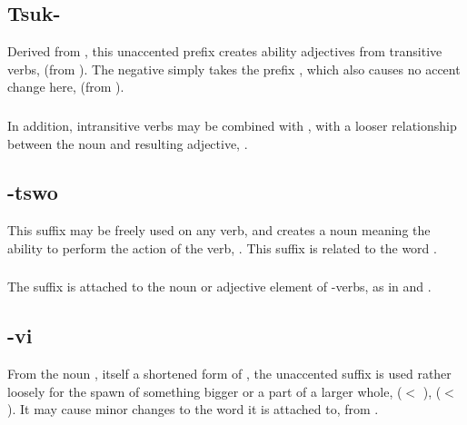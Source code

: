 \subsection{Tsuk-} Derived from , this unaccented prefix
creates ability adjectives from trans\-it\-ive verbs, 
 (from  ).  The negative simply takes the
prefix , which also causes no accent change here,
  (from  ).

\subsubsection{} In addition, intransitive verbs may
be combined with , with a looser relationship between the
noun and resulting adjective, 
  .

\subsection{-tswo} This suffix may be freely used on any verb, and
creates a noun meaning the ability to perform the action of the verb,
   .
This suffix is related to the word  .

\subsubsection{} The suffix  is attached to the noun or
adjective element of -verbs, as in   and  .

\subsection{-vi} From the noun , itself a shortened form of
 , the unaccented suffix  is used rather
loosely for the spawn of something bigger or a part of a larger whole,
  ($<$  ), 
 ($<$  ).  It may
cause minor changes to the word it is attached to, 
 from  .

